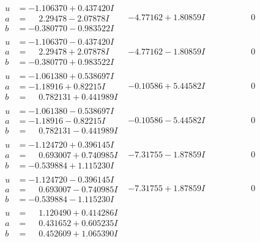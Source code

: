 \documentclass[1p]{elsarticle_modified}
\theoremstyle{definition}
\begin{document}
$$\begin{array}{c|c|c}
\begin{aligned}
u &= -1.106370 + 0.437420 I \\
a &= \phantom{-}2.29478 - 2.07878 I \\
b &= -0.380770 - 0.983522 I\end{aligned}
 & -4.77162 + 1.80859 I & \phantom{-0.000000 } 0 \\ \hline\begin{aligned}
u &= -1.106370 - 0.437420 I \\
a &= \phantom{-}2.29478 + 2.07878 I \\
b &= -0.380770 + 0.983522 I\end{aligned}
 & -4.77162 - 1.80859 I & \phantom{-0.000000 } 0 \\ \hline\begin{aligned}
u &= -1.061380 + 0.538697 I \\
a &= -1.18916 + 0.82215 I \\
b &= \phantom{-}0.782131 + 0.441989 I\end{aligned}
 & -0.10586 + 5.44582 I & \phantom{-0.000000 } 0 \\ \hline\begin{aligned}
u &= -1.061380 - 0.538697 I \\
a &= -1.18916 - 0.82215 I \\
b &= \phantom{-}0.782131 - 0.441989 I\end{aligned}
 & -0.10586 - 5.44582 I & \phantom{-0.000000 } 0 \\ \hline\begin{aligned}
u &= -1.124720 + 0.396145 I \\
a &= \phantom{-}0.693007 + 0.740985 I \\
b &= -0.539884 + 1.115230 I\end{aligned}
 & -7.31755 - 1.87859 I & \phantom{-0.000000 } 0 \\ \hline\begin{aligned}
u &= -1.124720 - 0.396145 I \\
a &= \phantom{-}0.693007 - 0.740985 I \\
b &= -0.539884 - 1.115230 I\end{aligned}
 & -7.31755 + 1.87859 I & \phantom{-0.000000 } 0 \\ \hline\begin{aligned}
u &= \phantom{-}1.120490 + 0.414286 I \\
a &= \phantom{-}0.431652 + 0.605235 I \\
b &= \phantom{-}0.452609 + 1.065390 I\end{aligned}

\end{array}$$
\end{document}

